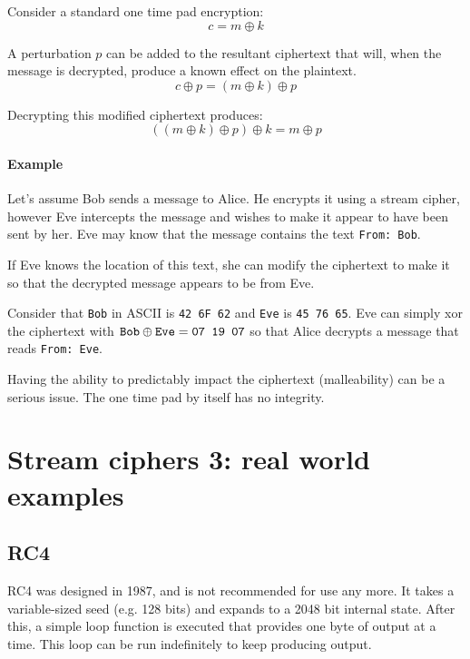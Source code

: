 \documentclass[10pt,a4paper]{report}
\begin{document}
Consider a standard one time pad encryption:
    $$ c = m \oplus k $$

A perturbation $p$ can be added to the resultant ciphertext that will, when the message is
decrypted, produce a known effect on the plaintext.
    $$ c \oplus p = (m \oplus k) \oplus p $$

Decrypting this modified ciphertext produces:
    $$ ((m \oplus k) \oplus p) \oplus k = m \oplus p $$

\paragraph{Example} Let's assume Bob sends a message to Alice. He encrypts it using a stream
cipher, however Eve intercepts the message and wishes to make it appear to have been sent by her.
Eve may know that the message contains the text \verb!From: Bob!.

If Eve knows the location of this text, she can modify the ciphertext to make it so that the
decrypted message appears to be from Eve.

Consider that \verb!Bob! in ASCII is \verb!42 6F 62! and \verb!Eve! is \verb!45 76 65!. Eve can
simply xor the ciphertext with $\verb!Bob! \oplus \verb!Eve! = \verb!07 19 07!$ so that Alice
decrypts a message that reads \verb!From: Eve!.

Having the ability to predictably impact the ciphertext (malleability) can be a serious issue. The
one time pad by itself has no integrity.

\section{Stream ciphers 3: real world examples}

\subsection{RC4}

RC4 was designed in 1987, and is not recommended for use any more. It takes a variable-sized seed
(e.g. 128 bits) and expands to a 2048 bit internal state. After this, a simple loop function is
executed that provides one byte of output at a time. This loop can be run indefinitely to keep
producing output.

\begin{figure}[H]
    \centering
\end{figure}
\end{document}

